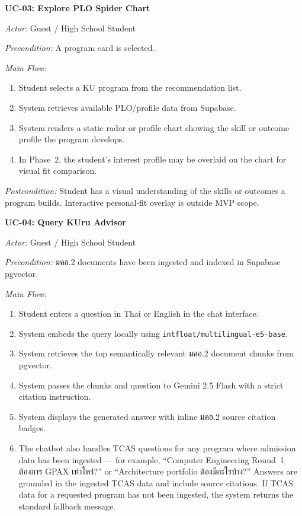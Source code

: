 \vspace{1ex}
\noindent\textbf{UC-03: Explore PLO Spider Chart}

\noindent\textit{Actor:} Guest / High School Student

\noindent\textit{Precondition:} A program card is selected.

\noindent\textit{Main Flow:}
\begin{enumerate}[leftmargin=80pt]
    \item Student selects a KU program from the recommendation list.
    \item System retrieves available PLO/profile data from Supabase.
    \item System renders a static radar or profile chart showing the skill or outcome profile the program develops.
    \item In Phase~2, the student's interest profile may be overlaid on the chart for visual fit comparison.
\end{enumerate}

\noindent\textit{Postcondition:} Student has a visual understanding of the skills or outcomes a program builds. Interactive personal-fit overlay is outside MVP scope.

\vspace{1ex}
\noindent\textbf{UC-04: Query KUru Advisor}

\noindent\textit{Actor:} Guest / High School Student

\noindent\textit{Precondition:} มคอ.2 documents have been ingested and indexed in Supabase pgvector.

\noindent\textit{Main Flow:}
\begin{enumerate}[leftmargin=80pt]
    \item Student enters a question in Thai or English in the chat interface.
    \item System embeds the query locally using \texttt{intfloat/multilingual-e5-base}.
    \item System retrieves the top semantically relevant มคอ.2 document chunks from pgvector.
    \item System passes the chunks and question to Gemini 2.5 Flash with a strict citation instruction.
    \item System displays the generated answer with inline มคอ.2 source citation badges.
    \item The chatbot also handles TCAS questions for any program where admission data has been ingested --- for example, ``Computer Engineering Round~1 ต้องการ GPAX เท่าไหร่?'' or ``Architecture portfolio ต้องมีอะไรบ้าง?'' Answers are grounded in the ingested TCAS data and include source citations. If TCAS data for a requested program has not been ingested, the system returns the standard fallback message.
\end{enumerate}

